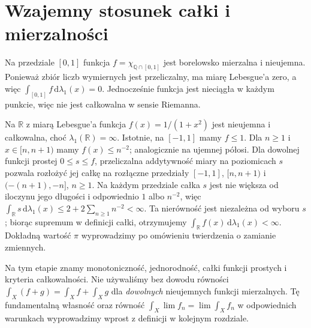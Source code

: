\section{Wzajemny stosunek całki i mierzalności}

\begin{przyklad}
Na przedziale $[0,1]$ funkcja
$f=\chi_{\mathbb Q\cap[0,1]}$ jest borelowsko
mierzalna i nieujemna. Ponieważ zbiór liczb
wymiernych jest przeliczalny, ma miarę Lebesgue'a
zero, a więc $\int_{[0,1]} f\,\mathrm d\lambda_1(x)=0$.
Jednocześnie funkcja jest nieciągła w każdym punkcie,
więc nie jest całkowalna w sensie Riemanna.
\end{przyklad}

\begin{przyklad}
Na $\mathbb R$ z miarą Lebesgue'a funkcja
$f(x)=1/(1+x^2)$ jest nieujemna i całkowalna, choć
$\lambda_1(\mathbb R)=\infty$. Istotnie, na $[-1,1]$
mamy $f\le1$. Dla $n\ge1$ i $x\in[n,n+1)$ mamy
$f(x)\le n^{-2}$; analogicznie na ujemnej półosi.
Dla dowolnej funkcji prostej $0\le s\le f$,
przeliczalna addytywność miary na poziomicach $s$
pozwala rozłożyć jej całkę na rozłączne przedziały
$[-1,1]$, $[n,n+1)$ i $(-(n+1),-n]$, $n\ge1$.
Na każdym przedziale całka $s$ jest nie większa
od iloczynu jego długości i odpowiednio $1$ albo
$n^{-2}$, więc
$\int_{\mathbb R}s\,\mathrm d\lambda_1(x)
\le2+2\sum_{n\ge1}n^{-2}<\infty$.
Ta nierówność jest niezależna od wyboru $s$;
biorąc supremum w definicji całki, otrzymujemy
$\int_{\mathbb R} f(x)\,\mathrm d\lambda_1(x)<\infty$. Dokładną wartość $\pi$ wyprowadzimy
po omówieniu twierdzenia o zamianie zmiennych.
\end{przyklad}

\begin{uwaga}
Na tym etapie znamy monotoniczność, jednorodność,
całki funkcji prostych i kryteria całkowalności.
Nie używaliśmy bez dowodu równości
$\int_X(f+g)=\int_X f+\int_X g$ dla \emph{dowolnych}
nieujemnych funkcji mierzalnych. Tę fundamentalną
własność oraz równość $\int_X\lim f_n=\lim\int_X f_n$
w odpowiednich warunkach wyprowadzimy wprost
z definicji w kolejnym rozdziale.
\end{uwaga}
